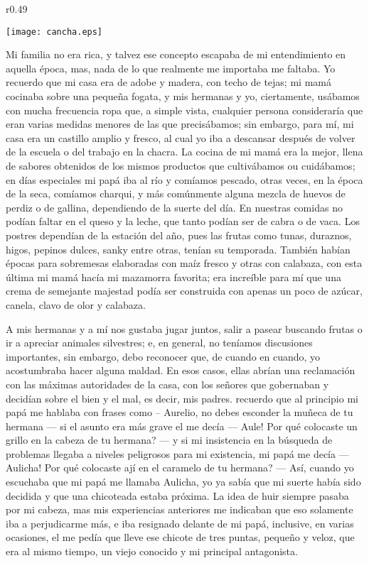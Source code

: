 \begin{wrapfigure}{r}{0.49\textwidth}
  \begin{center}
  \vspace{-20pt}
    \texttt{[image: cancha.eps]}
  \end{center}
  \vspace{-20pt}
\end{wrapfigure}
Mi familia no era rica, y talvez ese concepto escapaba de mi entendimiento en aquella época, mas, nada de lo que realmente me importaba me faltaba.   
Yo recuerdo que mi casa era de adobe y madera, con techo de tejas; mi mamá cocinaba sobre una pequeña fogata, y mis hermanas y yo, ciertamente, usábamos con mucha frecuencia ropa que, a simple vista, cualquier persona consideraría que eran varias medidas menores de las que precisábamos;
sin embargo, para mí, mi casa era un castillo amplio y fresco, al cual yo iba a descansar después de volver de la escuela o del trabajo en la chacra.
La cocina de mi mamá era la mejor, llena de sabores obtenidos de los mismos productos que cultivábamos ou cuidábamos; en días especiales mi papá iba al río y comíamos pescado, otras veces, en la época de la seca, comíamos charqui, y más comúnmente alguna mezcla de huevos de perdiz o de gallina, dependiendo de la suerte del día.
En nuestras comidas no podían faltar en el queso y la leche, que tanto podían ser de cabra o de vaca.
Los postres dependían de la estación del año, pues las frutas como tunas, duraznos, higos, pepinos dulces, sanky entre otras, tenían su temporada. También habían épocas para sobremesas elaboradas con maíz fresco y otras con calabaza, con esta última mi mamá hacía mi mazamorra favorita; era increíble para mí que una crema de semejante majestad podía ser construida con apenas un poco de azúcar, canela, clavo de olor y calabaza.

A mis hermanas y a mí nos gustaba jugar juntos, salir a pasear buscando frutas o ir a apreciar animales silvestres; e, en general, no teníamos discusiones importantes, sin embargo, debo reconocer que, de cuando en cuando, yo acostumbraba hacer alguna maldad.
En esos casos, ellas abrían una reclamación con las máximas autoridades de la casa, con los señores que gobernaban y decidían sobre el bien y el mal, es decir, mis padres. 
recuerdo que al principio mi papá me hablaba con frases como -- Aurelio, no debes esconder la muñeca de tu hermana --- si el asunto era más grave el me decía --- Aule! Por qué colocaste un grillo en la cabeza de tu hermana? --- y si mi insistencia en la búsqueda de problemas llegaba a niveles peligrosos para mi existencia, mi papá me decía --- Aulicha! Por qué colocaste ají en el caramelo de tu hermana? ---
Así, cuando yo escuchaba que mi papá me llamaba Aulicha, yo ya sabía que mi suerte había sido decidida y que una chicoteada estaba próxima. La idea de huir siempre pasaba por mi cabeza, mas mis experiencias anteriores me indicaban que eso solamente iba a perjudicarme más, e iba resignado delante de mi papá, inclusive, en varias ocasiones, el me pedía que lleve ese chicote de tres puntas, pequeño y veloz, que era al mismo tiempo, un viejo conocido y mi principal antagonista. 

